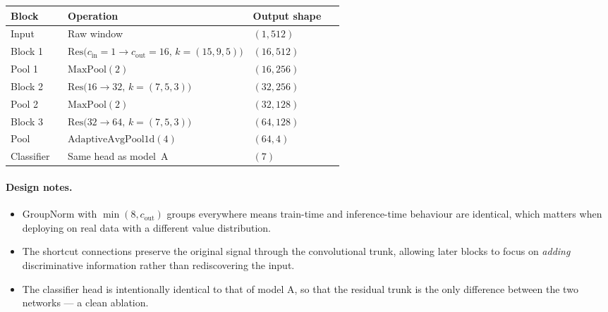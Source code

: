 \begin{table}[H]
    \centering
    \footnotesize
    \begin{tabular}{@{}l p{0.55\linewidth} l@{}}
        \toprule
        \textbf{Block} & \textbf{Operation} & \textbf{Output shape} \\
        \midrule
        Input       & Raw window                                                              & $(1, 512)$ \\
        Block 1     & $\mathrm{Res}\bigl( c_{\text{in}}{=}1 \to c_{\text{out}}{=}16, \, k{=}(15,9,5) \bigr)$ & $(16, 512)$ \\
        Pool 1      & $\mathrm{MaxPool}(2)$                                                   & $(16, 256)$ \\
        Block 2     & $\mathrm{Res}\bigl( 16 \to 32, \, k{=}(7,5,3) \bigr)$                   & $(32, 256)$ \\
        Pool 2      & $\mathrm{MaxPool}(2)$                                                   & $(32, 128)$ \\
        Block 3     & $\mathrm{Res}\bigl( 32 \to 64, \, k{=}(7,5,3) \bigr)$                   & $(64, 128)$ \\
        Pool        & $\mathrm{AdaptiveAvgPool1d}(4)$                                          & $(64, 4)$ \\
        Classifier  & Same head as model~A                                                    & $(7)$ \\
        \bottomrule
    \end{tabular}
\end{table}

\paragraph{Design notes.}
\begin{itemize}[leftmargin=*, itemsep=0.2em]
    \item GroupNorm with $\min(8, c_{\text{out}})$ groups everywhere
    means train-time and inference-time behaviour are identical, which
    matters when deploying on real data with a different value
    distribution.
    \item The shortcut connections preserve the original signal
    through the convolutional trunk, allowing later blocks to focus on
    \emph{adding} discriminative information rather than rediscovering
    the input.
    \item The classifier head is intentionally identical to that of
    model A, so that the residual trunk is the only difference
    between the two networks --- a clean ablation.
\end{itemize}

